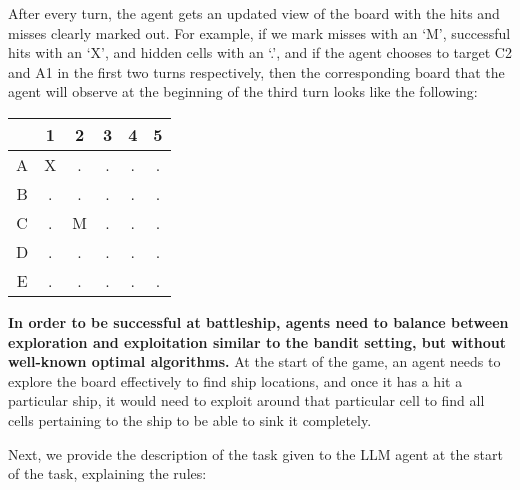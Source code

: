 After every turn, the agent gets an updated view of the board with the hits and misses clearly marked out. For example, if we mark misses with an `M', successful hits with an `X', and hidden cells with an `.', and if the agent chooses to target C2 and A1 in the first two turns respectively, then the corresponding board that the agent will observe at the beginning of the third turn looks like the following:

\begin{table}[h]
\centering
\begin{tabular}{|c|c|c|c|c|c|}
\hline
& 1 & 2 & 3 & 4 & 5 \\
\hline
A & X & . & . & . & . \\
\hline
B & . & . & . & . & . \\
\hline
C & . & M & . & . & . \\
\hline
D & . & . & . & .  & . \\
\hline
E & . & . & . & . & . \\
\hline
\end{tabular}
\end{table}

\textbf{In order to be successful at battleship, agents need to balance between exploration and exploitation similar to the bandit setting, but without well-known optimal algorithms.} At the start of the game, an agent needs to explore the board effectively to find ship locations, and once it has a hit a particular ship, it would need to exploit around that particular cell to find all cells pertaining to the ship to be able to sink it completely.

Next, we provide the description of the task given to the LLM agent at the start of the task, explaining the rules:

